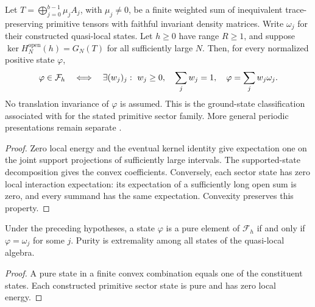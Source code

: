 \begin{theorem}
    \label{thm:primitive_multiblock_quasi_local_ground_state_classification}
    \leanok
    Let $T=\bigoplus_{j=0}^{b-1}\mu_jA_j$, with $\mu_j\ne0$, be a finite
    weighted sum of inequivalent trace-preserving primitive tensors with
    faithful invariant density matrices. Write $\omega_j$ for their
    constructed quasi-local states. Let $h\geq0$ have range $R\geq1$,
    and suppose $\ker H_N^{\mathrm{open}}(h)=G_N(T)$ for all sufficiently
    large $N$. Then, for every normalized positive state $\varphi$,
    \begin{align}
        \varphi\in\mathcal F_h
        \quad\Longleftrightarrow\quad
        \exists (w_j)_j:\ w_j\geq0,\quad\sum_jw_j=1,\quad
        \varphi=\sum_j w_j\omega_j.
        \notag
    \end{align}
    No translation invariance of $\varphi$ is assumed. This is the
    ground-state classification associated with
    \cite[Theorems~1.1--1.2]{Nachtergaele1996Spectral} for the stated
    primitive sector family. More general periodic presentations remain
    separate \cite{gap:nachtergaele96_infinite_volume_ground_projection}.
\end{theorem}
\begin{proof}\leanok
    Zero local energy and the eventual kernel identity give expectation
    one on the joint support projections of sufficiently large intervals.
    The supported-state decomposition gives the convex coefficients.
    Conversely, each sector state has zero local interaction expectation:
    its expectation of a sufficiently long open sum is zero, and every
    summand has the same expectation. Convexity preserves this property.
\end{proof}

\begin{corollary}
    \label{thm:primitive_multiblock_pure_ground_state_classification}
    \leanok
    Under the preceding hypotheses, a state $\varphi$ is a pure element of
    $\mathcal F_h$ if and only if $\varphi=\omega_j$ for some $j$.
    Purity is extremality among all states of the quasi-local algebra.
\end{corollary}
\begin{proof}\leanok
    A pure state in a finite convex combination equals one of the
    constituent states. Each constructed primitive sector state is pure
    and has zero local energy.
\end{proof}

